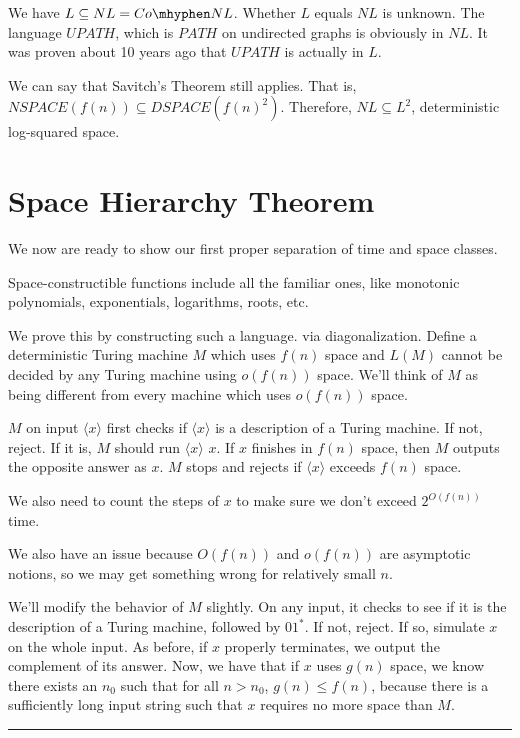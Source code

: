 \documentclass[twoside]{article}
\newenvironment{proof}{{\bf Proof:}}{\hfill\rule{2mm}{2mm}}
\begin{document}
We have $L\subseteq NL = Co\mhyphen NL$.  Whether $L$ equals $NL$ is unknown.  The language $UPATH$, which is $PATH$ on undirected graphs is obviously in $NL$.  It was proven about 10 years ago that $UPATH$ is actually in $L$.

We can say that Savitch's Theorem still applies.  That is, $NSPACE(f(n)) \subseteq DSPACE(f(n)^2)$. Therefore, $NL\subseteq L^2$, deterministic log-squared space.


\section*{Space Hierarchy Theorem}

We now are ready to show our first proper separation of time and space classes.


Space-constructible functions include all the familiar ones, like monotonic polynomials, exponentials, logarithms, roots, etc.


\begin{proof}
	
	We prove this by constructing such a language. via diagonalization.  Define a deterministic Turing machine $M$ which uses $f(n)$ space and $L(M)$ cannot be decided by any Turing machine using $o(f(n))$ space.  We'll think of $M$ as being different from every machine which uses $o(f(n))$ space.
	
	$M$ on input $\langle x\rangle $ first checks if $\langle x\rangle $ is a description of a Turing machine.  If not, reject.  If it is, $M$ should run $\langle x\rangle$ $x$.  If $x$ finishes in $f(n)$ space, then $M$ outputs the opposite answer as $x$.  $M$ stops and rejects if $\langle x \rangle$ exceeds $f(n)$ space.
	
	We also need to count the steps of $x$ to make sure we don't exceed $2^{O(f(n))}$ time.
	
	We also have an issue because $O(f(n))$ and $o(f(n))$ are asymptotic notions, so we may get something wrong for relatively small $n$.  
	
	We'll modify the behavior of $M$ slightly.  On any input, it checks to see if it is the description of a Turing machine, followed by $01^*$.  If not, reject.  If so, simulate $x$ on the whole input.  As before, if $x$ properly terminates, we output the complement of its answer.  Now, we have that if $x$ uses $g(n)$ space, we know there exists an $n_0$ such that for all $n>n_0$, $g(n)\leq f(n)$, because there is a sufficiently long input string such that $x$ requires no more space than $M$.
	
	
\end{proof}
\end{document}
